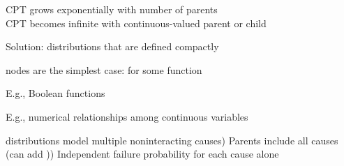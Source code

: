 \documentclass{article}
\begin{document}
\begin{huge}
\vspace*{0.1in}

\textwidth
{}



\vspace*{0.1in}

\textwidth
{}




CPT grows exponentially with number of parents\\
CPT becomes infinite with continuous-valued parent or child

Solution:  distributions that are defined compactly

 nodes are the simplest case:\al
    for some function 

E.g., Boolean functions\al

E.g., numerical relationships among continuous variables
\mat{\[
  \frac{\partial Level}{\partial t} = \mbox{ inflow + precipitation 
                                            - outflow - evaporation}
\]}



 distributions model multiple noninteracting causes) Parents  include all causes (can add )) Independent failure probability  for each cause alone\nl


\end{huge}
\end{document}
